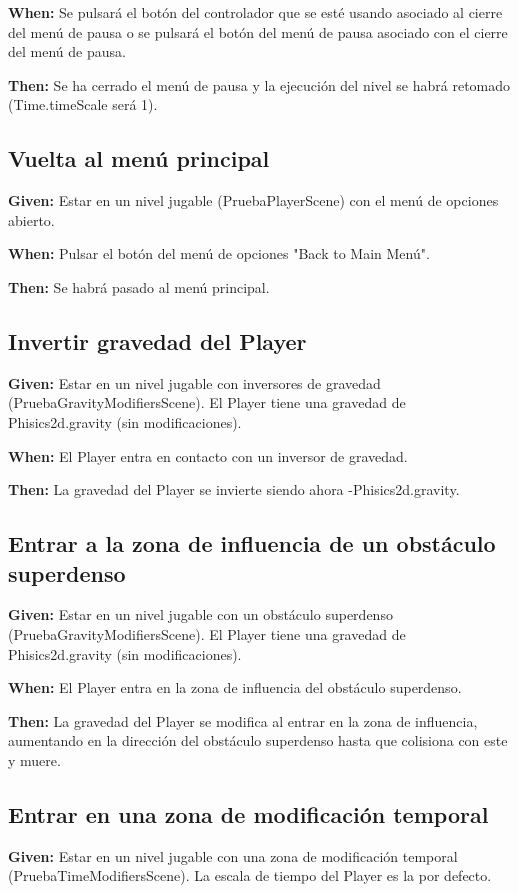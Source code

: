 \textbf{When:} Se pulsará el botón del controlador que se esté usando asociado al cierre del menú de pausa o se pulsará el botón del menú de pausa asociado con el cierre del menú de pausa.

\textbf{Then:} Se ha cerrado el menú de pausa y la ejecución del nivel se habrá retomado (Time.timeScale será 1).

\subsection{Vuelta al menú principal}
\textbf{Given:} Estar en un nivel jugable (PruebaPlayerScene) con el menú de opciones abierto.

\textbf{When:} Pulsar el botón del menú de opciones "Back to Main Menú".

\textbf{Then:} Se habrá pasado al menú principal.

\subsection{Invertir gravedad del Player}
\textbf{Given:} Estar en un nivel jugable con inversores de gravedad (PruebaGravityModifiersScene). El Player tiene una gravedad de Phisics2d.gravity (sin modificaciones).

\textbf{When:} El Player entra en contacto con un inversor de gravedad.

\textbf{Then:} La gravedad del Player se invierte siendo ahora -Phisics2d.gravity.

\subsection{Entrar a la zona de influencia de un obstáculo superdenso}
\textbf{Given:} Estar en un nivel jugable con un obstáculo superdenso (PruebaGravityModifiersScene). El Player tiene una gravedad de Phisics2d.gravity (sin modificaciones).

\textbf{When:} El Player entra en la zona de influencia del obstáculo superdenso.

\textbf{Then:} La gravedad del Player se modifica al entrar en la zona de influencia, aumentando en la dirección del obstáculo superdenso hasta que colisiona con este y muere.

\subsection{Entrar en una zona de modificación temporal}
\textbf{Given:} Estar en un nivel jugable con una zona de modificación temporal (PruebaTimeModifiersScene). La escala de tiempo del Player es la por defecto.

